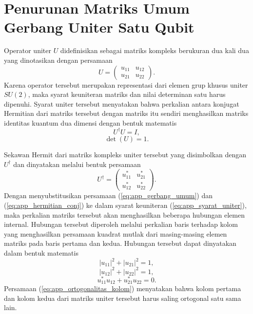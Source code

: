 \chapter{Penurunan Matriks Umum Gerbang Uniter Satu Qubit}
\label{app:penurunan_gerbang_uniter}

Operator uniter $U$ didefinisikan sebagai matriks kompleks berukuran dua kali dua yang dinotasikan dengan persamaan
\begin{equation}
\label{eq:app_gerbang_umum}
U = \begin{pmatrix} u_{11} & u_{12} \\ u_{21} & u_{22} \end{pmatrix}.
\end{equation}
Karena operator tersebut merupakan representasi dari elemen grup khusus uniter $SU(2)$, maka syarat keuniteran matriks dan nilai determinan satu harus dipenuhi. Syarat uniter tersebut menyatakan bahwa perkalian antara konjugat Hermitian dari matriks tersebut dengan matriks itu sendiri menghasilkan matriks identitas kuantum dua dimensi dengan bentuk matematis
\begin{equation}
\label{eq:app_syarat_uniter}
U^\dagger U = I,
\end{equation}
\begin{equation}
\label{eq:app_syarat_det}
\det(U) = 1.
\end{equation}

Sekawan Hermit dari matriks kompleks uniter tersebut yang disimbolkan dengan $U^\dagger$ dan dinyatakan melalui bentuk persamaan
\begin{equation}
\label{eq:app_hermitian_conj}
U^\dagger = \begin{pmatrix} u_{11}^* & u_{21}^* \\ u_{12}^* & u_{22}^* \end{pmatrix}.
\end{equation}
Dengan menyubstitusikan persamaan (\ref{eq:app_gerbang_umum}) dan (\ref{eq:app_hermitian_conj}) ke dalam syarat keuniteran (\ref{eq:app_syarat_uniter}), maka perkalian matriks tersebut akan menghasilkan beberapa hubungan elemen internal. Hubungan tersebut diperoleh melalui perkalian baris terhadap kolom yang menghasilkan persamaan kuadrat mutlak dari masing-masing elemen matriks pada baris pertama dan kedua. Hubungan tersebut dapat dinyatakan dalam bentuk matematis
\begin{equation}
\label{eq:app_norm_kolom1}
|u_{11}|^2 + |u_{21}|^2 = 1,
\end{equation}
\begin{equation}
\label{eq:app_norm_kolom2}
|u_{12}|^2 + |u_{22}|^2 = 1,
\end{equation}
\begin{equation}
\label{eq:app_ortogonalitas_kolom}
u_{11}^* u_{12} + u_{21}^* u_{22} = 0.
\end{equation}
Persamaan (\ref{eq:app_ortogonalitas_kolom}) menyatakan bahwa kolom pertama dan kolom kedua dari matriks uniter tersebut harus saling ortogonal satu sama lain.

